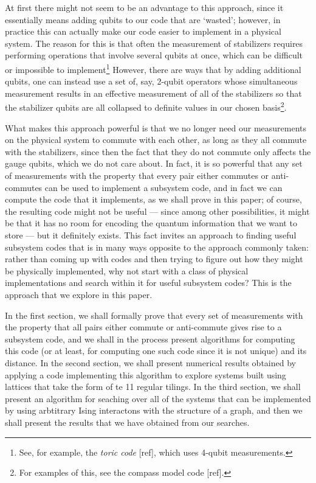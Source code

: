 \documentclass[twocolumn,showpacs,preprintnumbers,amsmath,amssymb,nofootinbib,pra,floatfix]{revtex4}
\begin{document}
At first there might not seem to be an advantage to this approach, since it essentially means adding  qubits to our code that are `wasted';  however, in practice this can actually make our code easier to implement in a physical system.  The reason for this is that often the measurement of stabilizers requires performing operations that involve several qubits at once, which can be difficult or impossible to implement\footnote{See, for example, the \emph{toric code} [ref], which uses 4-qubit measurements.}  However, there are ways that by adding additional qubits, one can instead use a set of, say, 2-qubit operators whose simultaneous measurement results in an effective measurement of all of the stabilizers so that the stabilizer qubits are all collapsed to definite values in our chosen basis\footnote{For examples of this, see the compass model code [ref].}.

What makes this approach powerful is that we no longer need our measurements on the physical system to commute with each other, as long as they all commute with the stabilizers, since then the fact that they do not commute only affects the gauge qubits, which we do not care about.  In fact, it is so powerful that any set of measurements with the property that every pair either commutes or anti-commutes can be used to implement a subsystem code, and in fact we can compute the code that it implements, as we shall prove in this paper;  of course, the resulting code might not be useful --- since among other possibilities, it might be that it has no room for encoding the quantum information that we want to store --- but it definitely exists.  This fact invites an approach to finding useful subsystem codes that is in many ways opposite to the approach commonly taken:  rather than coming up with codes and then trying to figure out how they might be physically implemented, why not start with a class of physical implementations and search within it for useful subsystem codes?  This is the approach that we explore in this paper.

In the first section, we shall formally prove that every set of measurements with the property that all pairs either commute or anti-commute gives rise to a subsystem code, and we shall in the process present algorithms for computing this code (or at least, for computing one such code since it is not unique) and its distance.  In the second section, we shall present numerical results obtained by applying a code implementing this algorithm to explore systems built using lattices that take the form of te 11 regular tilings.  In the third section, we shall present an algorithm for seaching over all of the systems that can be implemented by using arbtitrary Ising interactons with the structure of a graph, and then we shall present the results that we have obtained from our searches.
\end{document}
